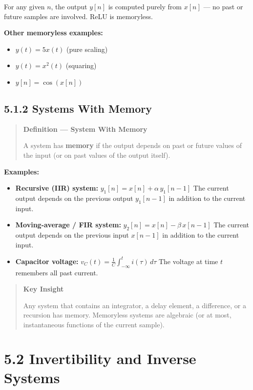 \documentclass[11pt]{article}
\begin{document}
For any given $n$, the output $y[n]$ is computed purely from $x[n]$ — no past or future samples are involved. ReLU is memoryless.

\textbf{Other memoryless examples:}

\begin{itemize}
  \item $y(t) = 5 x(t)$ (pure scaling)
  \item $y(t) = x^2(t)$ (squaring)
  \item $y[n] = \cos(x[n])$
\end{itemize}

\subsection*{5.1.2 Systems With Memory}

\begin{quote}
\textbf{Definition — System With Memory}

A system has \textbf{memory} if the output depends on past or future values of the input (or on past values of the output itself).
\end{quote}

\textbf{Examples:}

\begin{itemize}
  \item \textbf{Recursive (IIR) system:} $y_1[n] = x[n] + \alpha\,y_1[n-1]$ The current output depends on the previous output $y_1[n-1]$ in addition to the current input.
  \item \textbf{Moving-average / FIR system:} $y_2[n] = x[n] - \beta\,x[n-1]$ The current output depends on the previous input $x[n-1]$ in addition to the current input.
  \item \textbf{Capacitor voltage:} $v_C(t) = \frac{1}{C}\int_{-\infty}^{t} i(\tau)\,d\tau$ The voltage at time $t$ remembers all past current.
\end{itemize}

\begin{quote}
\textbf{Key Insight}

Any system that contains an integrator, a delay element, a difference, or a recursion has memory. Memoryless systems are algebraic (or at most, instantaneous functions of the current sample).
\end{quote}

\section*{5.2 Invertibility and Inverse Systems}
\end{document}
